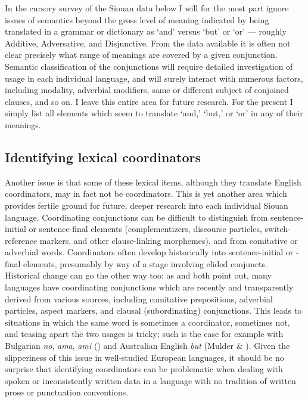 \documentclass[output=paper]{LSP/langsci}
\begin{document}
In the cursory survey of the Siouan data below I will for the most part ignore issues of semantics beyond the gross level of meaning indicated by being translated in a grammar or dictionary as `and' versus `but' or `or' --- roughly Additive, Adversative, and Disjunctive. From the data available it is often not clear precisely what range of meanings are covered by a given conjunction. Semantic classification of the conjunctions will require detailed investigation of usage in each individual language, and will surely interact with numerous factors, including modality, adverbial modifiers, same or different subject of conjoined clauses, and so on. I leave this entire area for future research. For the present I simply list all elements which seem to translate `and,' `but,' or `or' in any of their meanings.

\subsection{Identifying lexical coordinators}

Another issue is that some of these lexical items, although they translate English coordinators, may in fact not be coordinators. This is yet another area which provides fertile ground for future, deeper research into each individual Siouan language. Coordinating conjunctions can be difficult to distinguish from sentence-initial or sentence-final elements (complementizers, discourse particles, switch-reference markers, and other clause-linking morphemes), and from comitative or adverbial words. Coordinators often develop historically into sentence-initial or -final elements, presumably by way of a stage involving elided conjuncts. Historical change can go the other way too: as \citet{Mithun1988} and \citet{Stassen2000} both point out, many languages have coordinating conjunctions which are recently and transparently derived from various sources, including comitative prepositions, adverbial particles, aspect markers, and clausal (subordinating) conjunctions. This leads to situations in which the same word is sometimes a coordinator, sometimes not, and teasing apart the two usages is tricky; such is the case for example with Bulgarian \textit{no}, \textit{ama}, \textit{ami} (\citealt{Fielder2008}) and Australian English \textit{but} (Mulder \& \citealt{Thompson2008}). Given the slipperiness of this issue in well-studied European languages, it should be no surprise that identifying coordinators can be problematic when dealing with spoken or inconsistently written data in a language with no tradition of written prose or punctuation conventions.
\end{document}
